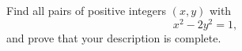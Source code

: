 Find all pairs of positive integers $(x,y)$ with
\[
x^2-2y^2=1,
\]
and prove that your description is complete.
